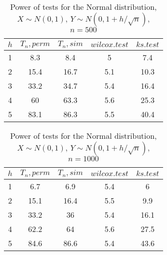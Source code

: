 \documentclass{svproc}
\begin{document}
\begin{table}
  \caption{Power of tests for the Normal distribution, $X\sim N(0,1)$, $Y\sim N(0, 1 + h/\sqrt{n})$, $n=500$}
  \begin{center}
  \begin{tabular}{c@{\quad}c@{\quad}c@{\quad}c@{\quad}c}
  \hline
  $h$ & $T_n, perm$ & $T_n, sim$ & $wilcox.test$ & $ks.test$ \\
  \hline
  1 & 8.3 & 8.4 & 5 & 7.4 \\
  2 & 15.4 & 16.7 & 5.1 & 10.3 \\
  3 & 33.2 & 34.7 & 5.4 & 16.4 \\
  4 & 60 & 63.3 & 5.6 & 25.3 \\
  5 & 83.1 & 86.3 & 5.5 & 40.4 \\
  \hline
  \end{tabular}
  \end{center}
\end{table}

\begin{table}
  \caption{Power of tests for the Normal distribution, $X\sim N(0,1)$, $Y\sim N(0, 1 + h/\sqrt{n})$, $n=1000$}
  \begin{center}
  \begin{tabular}{c@{\quad}c@{\quad}c@{\quad}c@{\quad}c}
  \hline
  $h$ & $T_n, perm$ & $T_n, sim$ & $wilcox.test$ & $ks.test$ \\
  \hline
  1 & 6.7 & 6.9 & 5.4 & 6 \\
  2 & 15.1 & 16.4 & 5.5 & 9.9 \\
  3 & 33.2 & 36 & 5.4 & 16.1 \\
  4 & 62.2 & 64 & 5.6 & 27.5 \\
  5 & 84.6 & 86.6 & 5.4 & 43.6 \\
  \hline
  \end{tabular}
  \end{center}
\end{table}
\end{document}
